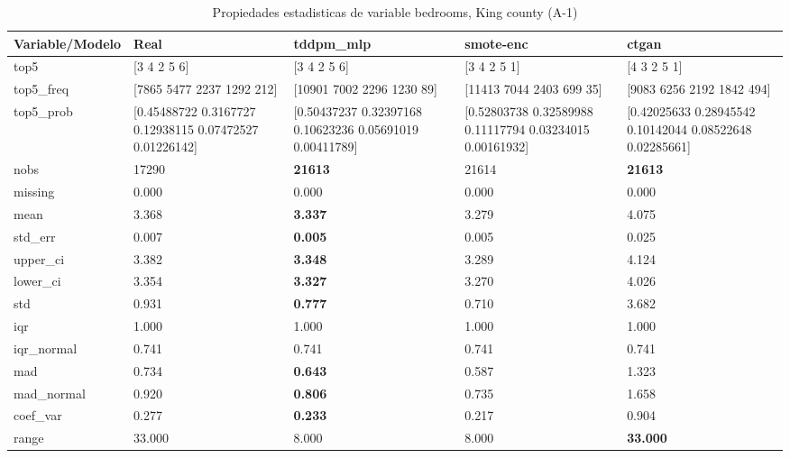 \begin{table}[H]
\centering
\fontsize{8}{14}\selectfont
\caption{Propiedades  estadisticas de variable bedrooms, King county (A-1)}
\label{table-stats-king county-a-1-bedrooms}
\begin{tabular}{|l|m{10em}|m{10em}|m{10em}|m{10em}|}
\hline
 \rowcolor[gray]{0.8}
Variable/Modelo & Real & tddpm\_mlp & smote-enc & ctgan \\
\hline top5 & [3 4 2 5 6] & [3 4 2 5 6] & [3 4 2 5 1] & [4 3 2 5 1] \\
\hline top5\_freq & [7865 5477 2237 1292  212] & [10901  7002  2296  1230    89] & [11413  7044  2403   699    35] & [9083 6256 2192 1842  494] \\
\hline top5\_prob & [0.45488722 0.3167727  0.12938115 0.07472527 0.01226142] & [0.50437237 0.32397168 0.10623236 0.05691019 0.00411789] & [0.52803738 0.32589988 0.11117794 0.03234015 0.00161932] & [0.42025633 0.28945542 0.10142044 0.08522648 0.02285661] \\
\hline nobs & 17290 & \bfseries 21613 & \cellcolor[rgb]{0.9, 0.54, 0.52} 21614 & \bfseries 21613 \\
\hline missing & 0.000 & 0.000 & 0.000 & 0.000 \\
\hline mean & 3.368 & \bfseries 3.337 & 3.279 & \cellcolor[rgb]{0.9, 0.54, 0.52} 4.075 \\
\hline std\_err & 0.007 & \bfseries 0.005 & 0.005 & \cellcolor[rgb]{0.9, 0.54, 0.52} 0.025 \\
\hline upper\_ci & 3.382 & \bfseries 3.348 & 3.289 & \cellcolor[rgb]{0.9, 0.54, 0.52} 4.124 \\
\hline lower\_ci & 3.354 & \bfseries 3.327 & 3.270 & \cellcolor[rgb]{0.9, 0.54, 0.52} 4.026 \\
\hline std & 0.931 & \bfseries 0.777 & 0.710 & \cellcolor[rgb]{0.9, 0.54, 0.52} 3.682 \\
\hline iqr & 1.000 & 1.000 & 1.000 & 1.000 \\
\hline iqr\_normal & 0.741 & 0.741 & 0.741 & 0.741 \\
\hline mad & 0.734 & \bfseries 0.643 & 0.587 & \cellcolor[rgb]{0.9, 0.54, 0.52} 1.323 \\
\hline mad\_normal & 0.920 & \bfseries 0.806 & 0.735 & \cellcolor[rgb]{0.9, 0.54, 0.52} 1.658 \\
\hline coef\_var & 0.277 & \bfseries 0.233 & 0.217 & \cellcolor[rgb]{0.9, 0.54, 0.52} 0.904 \\
\hline range & 33.000 & \cellcolor[rgb]{0.9, 0.54, 0.52} 8.000 & \cellcolor[rgb]{0.9, 0.54, 0.52} 8.000 & \bfseries 33.000 \\

\end{tabular}
\end{table}
